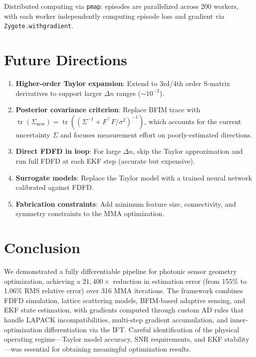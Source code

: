 \documentclass[11pt,a4paper]{article}
\newcommand{\tr}{\operatorname{tr}}
\begin{document}
Distributed computing via \texttt{pmap}: episodes are parallelized across 200 workers, with each worker independently computing episode loss and gradient via \texttt{Zygote.withgradient}.

\section{Future Directions}

\begin{enumerate}
  \item \textbf{Higher-order Taylor expansion}: Extend to 3rd/4th order S-matrix derivatives to support larger $\Delta n$ ranges ($\sim 10^{-2}$).

  \item \textbf{Posterior covariance criterion}: Replace BFIM trace with $\tr(\Sigma_{\text{new}}) = \tr((\Sigma^{-1} + F^\top F / \sigma^2)^{-1})$, which accounts for the current uncertainty $\Sigma$ and focuses measurement effort on poorly-estimated directions.

  \item \textbf{Direct FDFD in loop}: For large $\Delta n$, skip the Taylor approximation and run full FDFD at each EKF step (accurate but expensive).

  \item \textbf{Surrogate models}: Replace the Taylor model with a trained neural network calibrated against FDFD.

  \item \textbf{Fabrication constraints}: Add minimum feature size, connectivity, and symmetry constraints to the MMA optimization.
\end{enumerate}

\section{Conclusion}

We demonstrated a fully differentiable pipeline for photonic sensor geometry optimization, achieving a $21{,}400\times$ reduction in estimation error (from 155\% to 1.06\% RMS relative error) over 316 MMA iterations.  The framework combines FDFD simulation, lattice scattering models, BFIM-based adaptive sensing, and EKF state estimation, with gradients computed through custom AD rules that handle LAPACK incompatibilities, multi-step gradient accumulation, and inner-optimization differentiation via the IFT.  Careful identification of the physical operating regime---Taylor model accuracy, SNR requirements, and EKF stability---was essential for obtaining meaningful optimization results.
\end{document}
